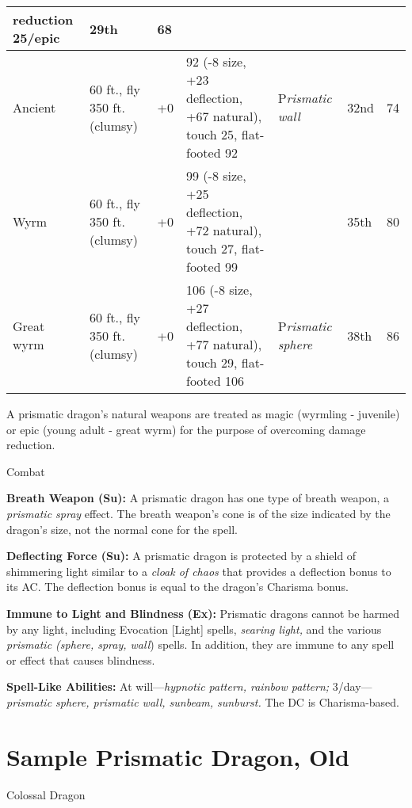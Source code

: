 \documentclass{article}
\begin{document}
\begin{tabular}{|>{\raggedright}p{31pt}|>{\raggedright}p{54pt}|>{\raggedright}p{23pt}|>{\raggedright}p{68pt}|>{\raggedright}p{59pt}|>{\raggedright}p{20pt}|>{\raggedright}p{8pt}|}
{reduction 25/epic} & 2{\small{}9th} & 6{\small{}8}\tabularnewline
\hline
A{\small{}ncient } & 6{\small{}0 ft., fly 350 ft. (clumsy) } & +{\small{}0} & 9{\small{}2 
(-8 size, +23 deflection, +67 natural), touch 25, flat-footed 92 } & P{\small{}\textit{rismatic 
wall}} & 3{\small{}2nd} & 7{\small{}4}\tabularnewline
\hline
W{\small{}yrm } & 6{\small{}0 ft., fly 350 ft. (clumsy) } & +{\small{}0} & 9{\small{}9 
(-8 size, +25 deflection, +72 natural), touch 27, flat-footed 99 } &  & 3{\small{}5th} & 8{\small{}0}\tabularnewline
\hline
G{\small{}reat wyrm } & 6{\small{}0 ft., fly 350 ft. (clumsy) } & +{\small{}0} & 1{\small{}06 
(-8 size, +27 deflection, +77 natural), touch 29, flat-footed 106 } & P{\small{}\textit{rismatic 
sphere}} & 3{\small{}8th} & 8{\small{}6}\tabularnewline
\hline
\end{tabular}

A prismatic dragon's natural weapons are treated as magic (wyrmling - juvenile) 
or epic (young adult - great wyrm) for the purpose of overcoming damage reduction.

Combat\textbf{ }

\textbf{Breath Weapon (Su):} A prismatic dragon has one type of breath weapon, 
a \textit{prismatic spray }effect. The breath weapon's cone is of the size indicated 
by the dragon's size, not the normal cone for the spell. 

\textbf{Deflecting Force (Su):} A prismatic dragon is protected by a shield of 
shimmering light similar to a \textit{cloak of chaos }that provides a deflection 
bonus to its AC. The deflection bonus is equal to the dragon's Charisma bonus. 

\textbf{Immune to Light and Blindness (Ex): }Prismatic dragons cannot be harmed 
by any light, including Evocation [Light] spells, \textit{searing light, }and the 
various \textit{prismatic (sphere, spray, wall}) spells. In addition, they are 
immune to any spell or effect that causes blindness. 

\textbf{Spell-Like Abilities:} At will---\textit{hypnotic pattern, rainbow pattern; 
}3/day---\textit{prismatic sphere, prismatic wall, sunbeam, sunburst.} The DC is 
Charisma-based.

\vspace{12pt}
\section*{\textbf{Sample Prismatic Dragon, Old }}

Colossal Dragon 
\end{document}
